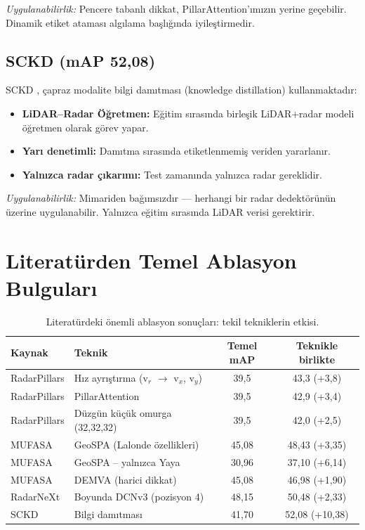 \documentclass[a4paper,11pt]{article}
\newcommand{\gain}[1]{\textcolor{bestcolor}{+#1}}
\begin{document}
\noindent
\textit{Uygulanabilirlik:} Pencere tabanlı dikkat, PillarAttention'ımızın yerine geçebilir. Dinamik etiket ataması algılama başlığında iyileştirmedir.

\subsection{SCKD (mAP 52{,}08)}

SCKD \cite{sckd}, çapraz modalite bilgi damıtması (knowledge distillation) kullanmaktadır:

\begin{itemize}[nosep]
    \item \textbf{LiDAR--Radar Öğretmen:} Eğitim sırasında birleşik LiDAR+radar modeli öğretmen olarak görev yapar.
    \item \textbf{Yarı denetimli:} Damıtma sırasında etiketlenmemiş veriden yararlanır.
    \item \textbf{Yalnızca radar çıkarımı:} Test zamanında yalnızca radar gereklidir.
\end{itemize}

\noindent
\textit{Uygulanabilirlik:} Mimariden bağımsızdır --- herhangi bir radar dedektörünün üzerine uygulanabilir. Yalnızca eğitim sırasında LiDAR verisi gerektirir.

\section{Literatürden Temel Ablasyon Bulguları}

\begin{table}[H]
\centering
\caption{Literatürdeki önemli ablasyon sonuçları: tekil tekniklerin etkisi.}
\label{tab:ablations}
\small
\renewcommand{\arraystretch}{1.15}
\begin{tabular}{@{}llcc@{}}
\toprule
\textbf{Kaynak} & \textbf{Teknik} & \textbf{Temel mAP} & \textbf{Teknikle birlikte} \\
\midrule
RadarPillars & Hız ayrıştırma (v$_r$ $\to$ v$_x$, v$_y$)    & 39{,}5 & 43{,}3 (\gain{3{,}8}) \\
RadarPillars & PillarAttention                                & 39{,}5 & 42{,}9 (\gain{3{,}4}) \\
RadarPillars & Düzgün küçük omurga (32,32,32)                 & 39{,}5 & 42{,}0 (\gain{2{,}5}) \\
MUFASA       & GeoSPA (Lalonde özellikleri)                    & 45{,}08 & 48{,}43 (\gain{3{,}35}) \\
MUFASA       & GeoSPA -- yalnızca Yaya                        & 30{,}96 & 37{,}10 (\gain{6{,}14}) \\
MUFASA       & DEMVA (harici dikkat)                           & 45{,}08 & 46{,}98 (\gain{1{,}90}) \\
RadarNeXt    & Boyunda DCNv3 (pozisyon 4)                      & 48{,}15 & 50{,}48 (\gain{2{,}33}) \\
SCKD         & Bilgi damıtması                                 & 41{,}70 & 52{,}08 (\gain{10{,}38}) \\
\bottomrule
\end{tabular}
\end{table}
\end{document}
